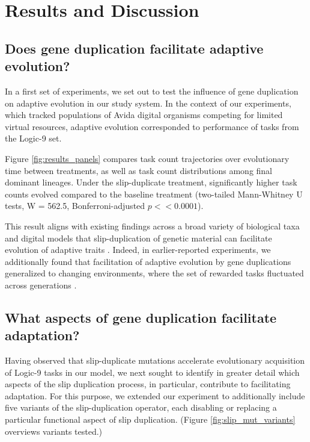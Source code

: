\section{Results and Discussion} \label{sec:results}

\subsection{Does gene duplication facilitate adaptive evolution?}

In a first set of experiments, we set out to test the influence of gene duplication on adaptive evolution in our study system.
In the context of our experiments, which tracked populations of Avida digital organisms competing for limited virtual resources, adaptive evolution corresponded to performance of tasks from the Logic-9 set.

Figure \ref{fig:results_panels} compares task count trajectories over evolutionary time between treatments, as well as task count distributions among final dominant lineages.
Under the slip-duplicate treatment, significantly higher task counts  evolved compared to the baseline treatment (two-tailed Mann-Whitney U tests, W = 562.5, Bonferroni-adjusted $p << 0.0001$).

This result aligns with existing findings across a broad variety of biological taxa and digital models that slip-duplication of genetic material can facilitate evolution of adaptive traits \citep{Koza:1995fr,Zhang:2003fw,Teichmann:2004cz}.
Indeed, in earlier-reported experiments, we additionally found that facilitation of adaptive evolution by gene duplications generalized to changing environments, where the set of rewarded tasks fluctuated across generations \citep{lalejini2017gene}.



\subsection{What aspects of gene duplication facilitate adaptation?}

Having observed that slip-duplicate mutations accelerate evolutionary acquisition of Logic-9 tasks in our model, we next sought to identify in greater detail which aspects of the slip duplication process, in particular, contribute to facilitating adaptation.
For this purpose, we extended our experiment to additionally include five variants of the slip-duplication operator, each disabling or replacing a particular functional aspect of slip duplication.
(Figure \ref{fig:slip_mut_variants} overviews variants tested.)

